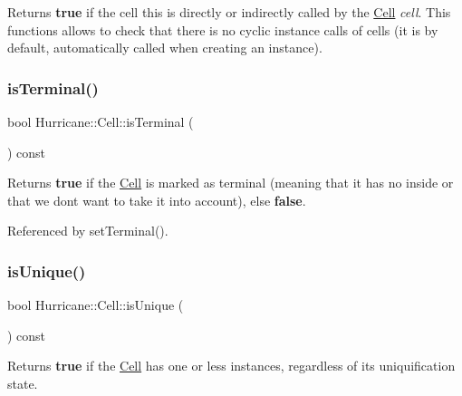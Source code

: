 Returns {\bfseries true} if the cell {\ttfamily this} is directly or indirectly called by the \mbox{\hyperlink{classHurricane_1_1Cell}{Cell}} {\itshape cell}. This functions allows to check that there is no cyclic instance calls of cells (it is by default, automatically called when creating an instance). \mbox{\label{classHurricane_1_1Cell_aac4e9218b7806f3a0f2d5a55f00abd69}} 
\subsubsection{\texorpdfstring{is\+Terminal()}{isTerminal()}}
{\footnotesize\ttfamily bool Hurricane\+::\+Cell\+::is\+Terminal (\begin{DoxyParamCaption}{ }\end{DoxyParamCaption}) const\hspace{0.3cm}{\ttfamily [inline]}}

Returns {\bfseries true} if the \mbox{\hyperlink{classHurricane_1_1Cell}{Cell}} is marked as terminal (meaning that it has no inside or that we dont want to take it into account), else {\bfseries false}. 

Referenced by set\+Terminal().

\mbox{\label{classHurricane_1_1Cell_a6c2f2fd9f6f6e0578937a90c0c37a507}} 
\subsubsection{\texorpdfstring{is\+Unique()}{isUnique()}}
{\footnotesize\ttfamily bool Hurricane\+::\+Cell\+::is\+Unique (\begin{DoxyParamCaption}{ }\end{DoxyParamCaption}) const}

Returns {\bfseries true} if the \mbox{\hyperlink{classHurricane_1_1Cell}{Cell}} has one or less instances, regardless of it\textquotesingle{}s uniquification state. \mbox{\label{classHurricane_1_1Cell_a86c21867e9ce896eae72fd2999ce8a2d}} 
